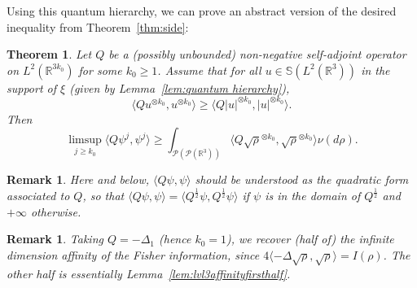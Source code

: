 \documentclass[11pt,a4paper]{article}
\theoremstyle{definition}
\theoremstyle{plain}
\newtheorem{theorem}[defi]{Theorem}
\newtheorem{remark}[defi]{Remark}
\DeclareMathOperator*{\Id}{Id}
\begin{document}
Using this quantum hierarchy, we can prove an abstract version of the desired inequality from Theorem~\ref{thm:side}:

\begin{theorem}
\label{thm:abstractlvl3affinity}
    Let $Q$ be a (possibly unbounded) non-negative self-adjoint operator on $L^2(\mathbb{R}^{3k_0})$ for some $k_0\geq 1$. Assume that for all $u\in\mathbb{S}(L^2(\mathbb{R}^{3}))$ in the support of $\xi$ (given by Lemma~\ref{lem:quantum hierarchy}), $$\langle Q u^{\otimes k_0}, u^{\otimes k_0}\rangle \geq \langle Q \vert u\vert^{\otimes k_0}, \vert u\vert^{\otimes k_0}\rangle.$$
    Then
    $$\limsup_{j\geq k_0}  \langle Q\psi^j,\psi^j\rangle \geq \int_{\mathcal{P}(\mathcal{P}(\mathbb{R}^{3}))} \langle Q \sqrt\rho^{\otimes k_0},\sqrt\rho^{\otimes k_0}\rangle \nu(d\rho).$$
\end{theorem}
\begin{remark}
    Here and below, $\langle Q \psi, \psi\rangle$ should be understood as the quadratic form associated to $Q$, so that $\langle Q \psi, \psi\rangle=\langle Q^\frac{1}{2} \psi, Q^\frac{1}{2}\psi\rangle$ if $\psi$ is in the domain of $Q^\frac{1}{2}$ and $+\infty$ otherwise.
\end{remark}
\begin{remark}
    Taking $Q=-\Delta_1$ (hence $k_0=1$), we recover (half of) the infinite dimension affinity of the Fisher information, since $4\langle -\Delta \sqrt{\rho}, \sqrt{\rho}\rangle=I(\rho)$. The other half is essentially Lemma~\ref{lem:lvl3affinityfirsthalf}.
\end{remark}
\end{document}
